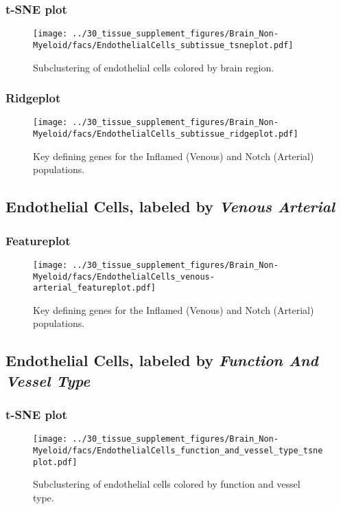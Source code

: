 \clearpage
\subsubsection{t-SNE plot}
\begin{figure}[h]
\centering
\texttt{[image: ../30\_tissue\_supplement\_figures/Brain\_Non-Myeloid/facs/EndothelialCells\_subtissue\_tsneplot.pdf]}

\caption{Subclustering of endothelial cells colored by brain region.
}
\end{figure}


\clearpage

\subsubsection{Ridgeplot}
\begin{figure}[h]
\centering
\texttt{[image: ../30\_tissue\_supplement\_figures/Brain\_Non-Myeloid/facs/EndothelialCells\_subtissue\_ridgeplot.pdf]}

\caption{Key defining genes for the Inflamed (Venous) and Notch (Arterial) populations.
}
\end{figure}


\clearpage

\subsection{Endothelial Cells, labeled by \emph{Venous Arterial}}

\clearpage
\subsubsection{Featureplot}
\begin{figure}[h]
\centering
\texttt{[image: ../30\_tissue\_supplement\_figures/Brain\_Non-Myeloid/facs/EndothelialCells\_venous-arterial\_featureplot.pdf]}

\caption{Key defining genes for the Inflamed (Venous) and Notch (Arterial) populations.
}
\end{figure}


\clearpage

\subsection{Endothelial Cells, labeled by \emph{Function And Vessel Type}}

\clearpage
\subsubsection{t-SNE plot}
\begin{figure}[h]
\centering
\texttt{[image: ../30\_tissue\_supplement\_figures/Brain\_Non-Myeloid/facs/EndothelialCells\_function\_and\_vessel\_type\_tsneplot.pdf]}

\caption{Subclustering of endothelial cells colored by function and vessel type.
}
\end{figure}


